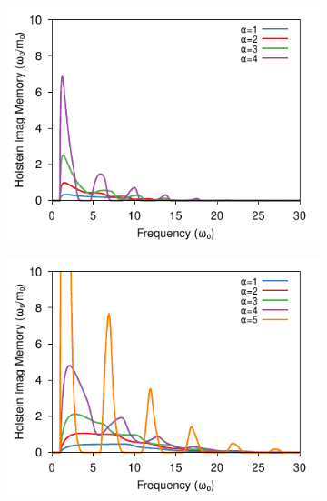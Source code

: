 \begin{figure}
\centering
  \begin{subfigure}[b]{0.49\textwidth}
    \includegraphics[width=\textwidth]{figures/holstein-1d-imag-memory-freq-COLOUR.pdf}
  \end{subfigure}
  \begin{subfigure}[b]{0.49\textwidth}
    \includegraphics[width=\textwidth]{figures/holstein-2d-imag-memory-freq-COLOUR.pdf}
  \end{subfigure}
  \begin{subfigure}[b]{0.49\textwidth}

\end{subfigure}
\end{figure}
